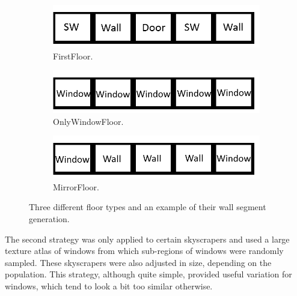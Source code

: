 \begin{figure}[H]
  \centering
  \begin{subfigure}[b]{0.32\textwidth}
    \includegraphics[width=\textwidth]{figure/FirstFloor.png}
    \caption{FirstFloor.}
  \end{subfigure}
  \quad
  \begin{subfigure}[b]{0.32\textwidth}
    \includegraphics[width=\textwidth]{figure/OnlyWindowFloor.png}
    \caption{OnlyWindowFloor.}
  \end{subfigure}
  \begin{subfigure}[b]{0.32\textwidth}
    \includegraphics[width=\textwidth]{figure/MirrorFloor.png}
    \caption{MirrorFloor.}
  \end{subfigure}
  \caption{Three different floor types and an example of their wall segment generation.}
  \label{fig:segmentsgen}
\end{figure}

The second strategy was only applied to certain skyscrapers and used a large texture atlas of windows from which sub-regions of windows were randomly sampled.
These skyscrapers were also adjusted in size, depending on the population.
This strategy, although quite simple, provided useful variation for windows, which tend to look a bit too similar otherwise.


